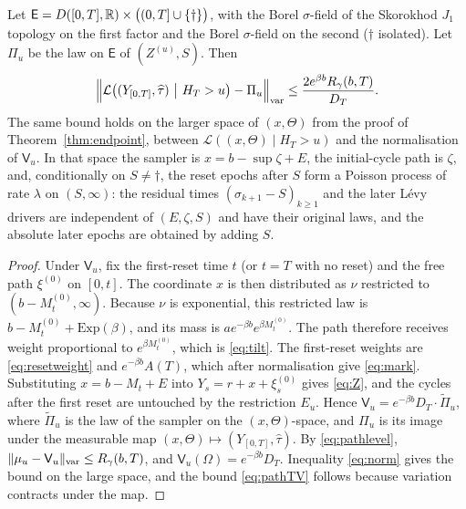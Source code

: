 \documentclass[11pt,a4paper]{article}
\begin{document}
\begin{theorem}\label{thm:path}
Let $\mathsf E=D([0,T],\mathbb R)\times\big((0,T]\cup\{\dagger\}\big)$, with the Borel $\sigma$-field of the Skorokhod $J_1$ topology on the first factor and the Borel $\sigma$-field on the second ($\dagger$ isolated). Let $\Pi_u$ be the law on $\mathsf E$ of $(Z^{(u)},S)$. Then
\begin{equation}\label{eq:pathTV}
 \Big\|\mathcal L\big((Y_{[0,T]},\widehat\tau)\ \big|\ H_T>u\big)-\Pi_u\Big\|_\var\le\frac{2e^{\beta b}R_\gamma(b,T)}{D_T}.
\end{equation}
The same bound holds on the larger space of $(x,\Theta)$ from the proof of Theorem~\ref{thm:endpoint}, between $\mathcal L((x,\Theta)\mid H_T>u)$ and the normalisation of $\mathsf V_u$. In that space the sampler is $x=b-\sup\zeta+E$, the initial-cycle path is $\zeta$, and, conditionally on $S\ne\dagger$, the reset epochs after $S$ form a Poisson process of rate $\lambda$ on $(S,\infty)$: the residual times $(\sigma_{k+1}-S)_{k\ge1}$ and the later L\'evy drivers are independent of $(E,\zeta,S)$ and have their original laws, and the absolute later epochs are obtained by adding $S$.
\end{theorem}

\begin{proof}
Under $\mathsf V_u$, fix the first-reset time $t$ (or $t=T$ with no reset) and the free path $\xi^{(0)}$ on $[0,t]$. The coordinate $x$ is then distributed as $\nu$ restricted to $(b-M^{(0)}_t,\infty)$. Because $\nu$ is exponential, this restricted law is $b-M^{(0)}_t+\mathrm{Exp}(\beta)$, and its mass is $ae^{-\beta b}e^{\beta M^{(0)}_t}$. The path therefore receives weight proportional to $e^{\beta M^{(0)}_t}$, which is \eqref{eq:tilt}. The first-reset weights are \eqref{eq:resetweight} and $e^{-\beta b}A(T)$, which after normalisation give \eqref{eq:mark}. Substituting $x=b-M_t+E$ into $Y_s=r+x+\xi^{(0)}_s$ gives \eqref{eq:Z}, and the cycles after the first reset are untouched by the restriction $E_u$. Hence $\mathsf V_u=e^{-\beta b}D_T\cdot\widetilde\Pi_u$, where $\widetilde\Pi_u$ is the law of the sampler on the $(x,\Theta)$-space, and $\Pi_u$ is its image under the measurable map $(x,\Theta)\mapsto(Y_{[0,T]},\widehat\tau)$. By \eqref{eq:pathlevel}, $\|\mu_u-\mathsf V_u\|_{\mathrm{var}}\le R_\gamma(b,T)$, and $\mathsf V_u(\Omega)=e^{-\beta b}D_T$. Inequality \eqref{eq:norm} gives the bound on the large space, and the bound \eqref{eq:pathTV} follows because variation contracts under the map.
\end{proof}
\end{document}
